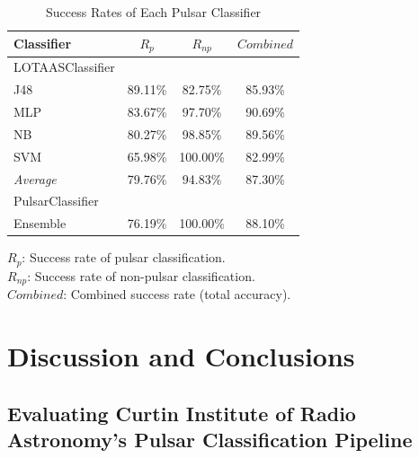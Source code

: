 \documentclass{article}
\begin{document}
\begin{table}[H]
    \centering
    
    \caption{Success Rates of Each Pulsar Classifier}

    \begin{framed}
        \begin{tabular}{l c c c}
            Classifier & $R_p$ & $R_{np}$ & $Combined$ \\
            \hline
            \hline
            LOTAASClassifier &  &  & \\
            \hline
            J48 & 89.11\% & 82.75\% & 85.93\% \\
            MLP & 83.67\% & 97.70\% & 90.69\% \\
            NB & 80.27\% & 98.85\% & 89.56\%\\
            SVM & 65.98\% & 100.00\% & 82.99\% \\
            \hdashline 
            \emph{Average} & 79.76\% & 94.83\% & 87.30\% \\
            \hline
            PulsarClassifier &  &  & \\
            \hline
            Ensemble & 76.19\% & 100.00\% & 88.10\% \\
            \hline
            \hline
        \end{tabular}

        \vspace{8px}
        $R_p$: Success rate of pulsar classification.\\
        $R_{np}$: Success rate of non-pulsar classification. \\
        $Combined$: Combined success rate (total accuracy).\\
    \end{framed}
    \label{tab:analyses}
\end{table}

\pagebreak
\section{Discussion and Conclusions}
\subsection{Evaluating Curtin Institute of Radio Astronomy's Pulsar Classification Pipeline}
\end{document}
